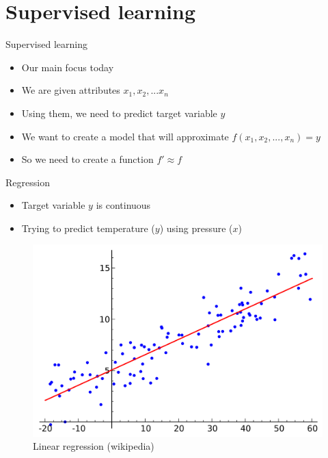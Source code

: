 \documentclass[aspectratio=169]{beamer}
\begin{document}
\section{Supervised learning}
\begin{frame}{Supervised learning}
    \begin{itemize}
        \item Our main focus today
        \item We are given attributes $x_1, x_2, ... x_n$
        \item Using them, we need to predict target variable $y$
        \item We want to create a model that will approximate $f(x_1, x_2, ..., x_n) = y$
        \item So we need to create a function $f' \approx f$
    \end{itemize}
\end{frame}
\begin{frame}{Regression}
    \begin{itemize}
        \item Target variable $y$ is continuous
        \item Trying to predict temperature ($y$) using pressure ($x$)
    \end{itemize}

    \begin{center}
        \begin{figure}
            \includegraphics[scale=0.12]{./images/linear_regression.png}
            \caption{Linear regression (wikipedia)}
        \end{figure}
    \end{center}
\end{frame}
\end{document}
